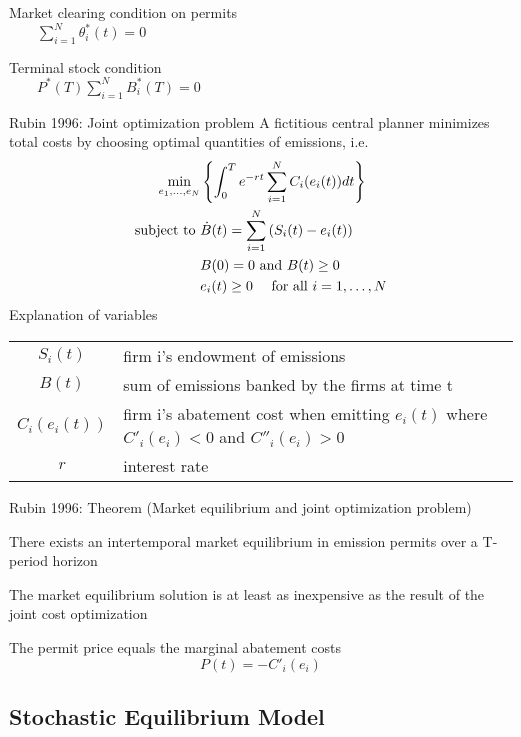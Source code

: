 
	Market clearing condition on permits \\
$
\qquad \sum_{i=1}^N \theta_i^*(t) = 0
$

	Terminal stock condition \\
$
\qquad P^*(T)\sum_{i=1}^N B^*_i(T) = 0
$



{Rubin 1996: Joint optimization problem}
A fictitious central planner minimizes total costs by choosing optimal quantities of emissions, i.e.
\begin{align}
\min_{e_1, \ldots, e_N} &\left\{ \int_0^T e^{-rt} \sum_{i=1}^N C_i(e_i(t)) dt \right\} \\
\textnormal{subject to }
&\dot{B}(t) = \sum_{i=1}^N \left(S_i(t) - e_i(t)\right) \\
&            B(0) = 0 \textnormal{ and } B(t) \ge 0 \\
&            e_i(t) \ge 0 \quad \textnormal{ for all } i = 1, \ldots, N
\end{align}
{Explanation of variables}
\begin{tiny}
\begin{tabular}{cl}
$S_i(t)$ & firm i's endowment of emissions \\
$B(t)$ & sum of emissions banked by the firms at time t\\
$C_i(e_i(t))$ & firm i's abatement cost when emitting $e_i(t)$ where $C'_i(e_i) < 0$ and $C''_i(e_i) > 0$ \\
$r$ & interest rate \\
\end{tabular}
\end{tiny}


{Rubin 1996: Theorem (Market equilibrium and joint optimization problem)}


	There exists an intertemporal market equilibrium in emission permits over a T-period horizon

	The market equilibrium solution is at least as inexpensive as the result of the joint cost optimization

	The permit price equals the marginal abatement costs
\[
P(t) = - C'_i(e_i)
\]


\subsection{Stochastic Equilibrium Model}

